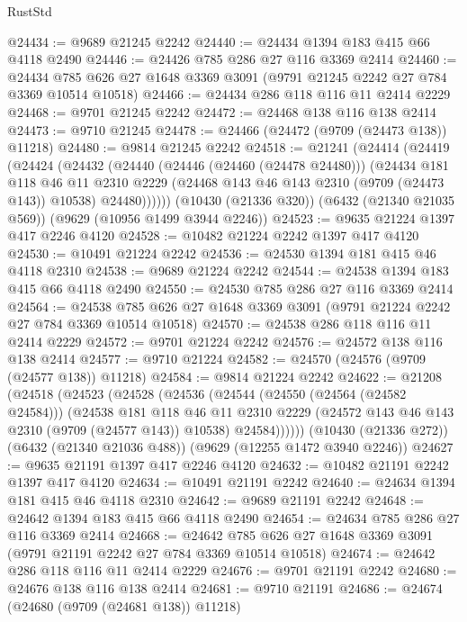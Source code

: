 \begin{lexlean}{RustStd}
\begin{coremodule}
@24434 := @9689 @21245 @2242
@24440 := @24434 @1394 @183 @415 @66 @4118 @2490
@24446 := @24426 @785 @286 @27 @116 @3369 @2414
@24460 := @24434 @785 @626 @27 @1648 @3369 @3091 (@9791 @21245 @2242 @27 @784 @3369 @10514 @10518)
@24466 := @24434 @286 @118 @116 @11 @2414 @2229
@24468 := @9701 @21245 @2242
@24472 := @24468 @138 @116 @138 @2414
@24473 := @9710 @21245
@24478 := @24466 (@24472 (@9709 (@24473 @138)) @11218)
@24480 := @9814 @21245 @2242
@24518 := @21241
    (@24414
      (@24419
        (@24424
          (@24432
            (@24440
              (@24446 (@24460 (@24478 @24480)))
              (@24434
                @181
                @118
                @46
                @11
                @2310
                @2229
                (@24468 @143 @46 @143 @2310 (@9709 (@24473 @143)) @10538)
                @24480))))))
    (@10430 (@21336 @320))
    (@6432 (@21340 @21035 @569))
    (@9629 (@10956 @1499 @3944 @2246))
@24523 := @9635 @21224 @1397 @417 @2246 @4120
@24528 := @10482 @21224 @2242 @1397 @417 @4120
@24530 := @10491 @21224 @2242
@24536 := @24530 @1394 @181 @415 @46 @4118 @2310
@24538 := @9689 @21224 @2242
@24544 := @24538 @1394 @183 @415 @66 @4118 @2490
@24550 := @24530 @785 @286 @27 @116 @3369 @2414
@24564 := @24538 @785 @626 @27 @1648 @3369 @3091 (@9791 @21224 @2242 @27 @784 @3369 @10514 @10518)
@24570 := @24538 @286 @118 @116 @11 @2414 @2229
@24572 := @9701 @21224 @2242
@24576 := @24572 @138 @116 @138 @2414
@24577 := @9710 @21224
@24582 := @24570 (@24576 (@9709 (@24577 @138)) @11218)
@24584 := @9814 @21224 @2242
@24622 := @21208
    (@24518
      (@24523
        (@24528
          (@24536
            (@24544
              (@24550 (@24564 (@24582 @24584)))
              (@24538
                @181
                @118
                @46
                @11
                @2310
                @2229
                (@24572 @143 @46 @143 @2310 (@9709 (@24577 @143)) @10538)
                @24584))))))
    (@10430 (@21336 @272))
    (@6432 (@21340 @21036 @488))
    (@9629 (@12255 @1472 @3940 @2246))
@24627 := @9635 @21191 @1397 @417 @2246 @4120
@24632 := @10482 @21191 @2242 @1397 @417 @4120
@24634 := @10491 @21191 @2242
@24640 := @24634 @1394 @181 @415 @46 @4118 @2310
@24642 := @9689 @21191 @2242
@24648 := @24642 @1394 @183 @415 @66 @4118 @2490
@24654 := @24634 @785 @286 @27 @116 @3369 @2414
@24668 := @24642 @785 @626 @27 @1648 @3369 @3091 (@9791 @21191 @2242 @27 @784 @3369 @10514 @10518)
@24674 := @24642 @286 @118 @116 @11 @2414 @2229
@24676 := @9701 @21191 @2242
@24680 := @24676 @138 @116 @138 @2414
@24681 := @9710 @21191
@24686 := @24674 (@24680 (@9709 (@24681 @138)) @11218)

\end{coremodule}
\end{lexlean}
